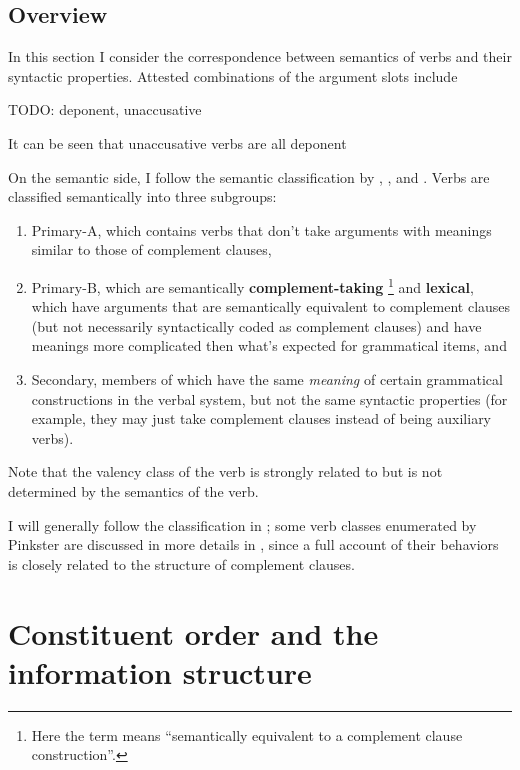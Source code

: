 \documentclass[a4paper, oneside, 12pt]{report}
\newcommand*{\citesec}[1]{\S~{#1}}
\newcommand*{\citechap}[1]{chap.~{#1}}
\newcommand*{\citepages}[1]{pp.~{#1}}
\newcommand*{\concept}[1]{\textbf{#1}}
\begin{document}
\subsection{Overview}\label{sec:verb-phrase.arguments.compatibility}

In this section I consider the correspondence between  
semantics of verbs and their syntactic properties.
Attested combinations of the argument slots include 

TODO: deponent, unaccusative

It can be seen that unaccusative verbs are all deponent
\citep[\citepages{308-309}]{oniga2014latin}

On the semantic side,
I follow the semantic classification by 
\citet[Part B]{dixon2005semantic},
\citet[\citesec{18.5}]{dixon2010basic2},
and \citet[\citesec{3.3}]{dixon2009basic1}.
Verbs are classified semantically into three subgroups:
\begin{enumerate}
    \item Primary-A, which contains verbs that 
    don't take arguments with meanings similar to those of complement clauses,
    \item Primary-B, which are semantically \concept{complement-taking}%
    \footnote{
        Here the term means ``semantically equivalent to a complement clause construction''.
    }
    and \concept{lexical},
    which have arguments that are semantically equivalent to complement clauses 
    (but not necessarily syntactically coded as complement clauses)
    and have meanings more complicated then what's expected for grammatical items, and 
    \item Secondary, members of which have the same \emph{meaning} 
    of certain grammatical constructions in the verbal system,
    but not the same syntactic properties
    (for example, they may just take complement clauses instead of being auxiliary verbs).
\end{enumerate}
Note that the valency class of the verb 
is strongly related to but is not determined by the semantics of the verb.


I will generally follow the classification in \citet[\citechap{4}]{Pinkster1};
some verb classes enumerated by Pinkster are discussed in more details 
in ,
since a full account of their behaviors is closely related to the structure of complement clauses.


\section{Constituent order and the information structure}\label{sec:clause.order}
\end{document}
